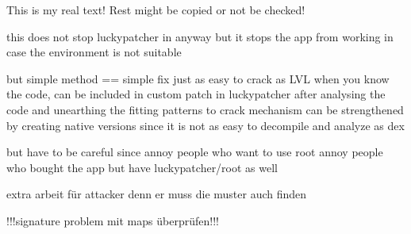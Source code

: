 This is my real text! Rest might be copied or not be checked!

this does not stop luckypatcher in anyway but it stops the app from working in case the environment is not suitable

but simple method == simple fix
just as easy to crack as LVL when you know the code, can be included in custom patch in luckypatcher after analysing the code and unearthing the fitting patterns to crack
mechanism can be strengthened by creating native versions since it is not as easy to decompile and analyze as dex

but have to be careful since
annoy people who want to use root
annoy people who bought the app but have luckypatcher/root as well

extra arbeit für attacker denn er muss die muster auch finden

!!!signature problem  mit maps überprüfen!!!
